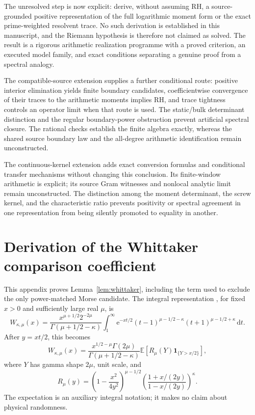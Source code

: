 \documentclass[11pt,letterpaper]{article}
\numberwithin{equation}{section}
\theoremstyle{definition}
\theoremstyle{remark}
\newcommand{\dd}{\,\mathrm d}
\newcommand{\e}{\mathrm e}
\begin{document}
The unresolved step is now explicit: derive, without assuming RH, a source-grounded positive representation of the full logarithmic moment form or the exact prime-weighted resolvent trace. No such derivation is established in this manuscript, and the Riemann hypothesis is therefore not claimed as solved. The result is a rigorous arithmetic realization programme with a proved criterion, an executed model family, and exact conditions separating a genuine proof from a spectral analogy.

The compatible-source extension supplies a further conditional route: positive interior elimination yields finite boundary candidates, coefficientwise convergence of their traces to the arithmetic moments implies RH, and trace tightness controls an operator limit when that route is used. The static/bulk determinant distinction and the regular boundary-power obstruction prevent artificial spectral closure. The rational checks establish the finite algebra exactly, whereas the shared source boundary law and the all-degree arithmetic identification remain unconstructed.

The continuous-kernel extension adds exact conversion formulas and conditional transfer mechanisms without changing this conclusion. Its finite-window arithmetic is explicit; its source Gram witnesses and nonlocal analytic limit remain unconstructed. The distinction among the moment determinant, the screw kernel, and the characteristic ratio prevents positivity or spectral agreement in one representation from being silently promoted to equality in another.

\appendix
\section{Derivation of the Whittaker comparison coefficient}
\label{app:whittaker}
This appendix proves Lemma~\ref{lem:whittaker}, including the term used to exclude the only power-matched Morse candidate. The integral representation \cite{dlmf}, for fixed $x>0$ and sufficiently large real $\mu$, is
\begin{equation}
 W_{\kappa,\mu}(x)=
 \frac{x^{\mu+1/2}2^{-2\mu}}{\Gamma(\mu+1/2-\kappa)}
 \int_1^\infty\e^{-xt/2}
 (t-1)^{\mu-1/2-\kappa}(t+1)^{\mu-1/2+\kappa}\dd t.
 \label{eq:whittakerintegral}
\end{equation}
After $y=xt/2$, this becomes
\begin{equation}
 W_{\kappa,\mu}(x)=
 \frac{x^{1/2-\mu}\Gamma(2\mu)}{\Gamma(\mu+1/2-\kappa)}
 \mathbb E\!\left[R_\mu(Y)\mathbf1_{\{Y>x/2\}}\right],
 \label{eq:gammaexpectation}
\end{equation}
where $Y$ has gamma shape $2\mu$, unit scale, and
\begin{equation}
 R_\mu(y)=
 \left(1-\frac{x^2}{4y^2}\right)^{\mu-1/2}
 \left(\frac{1+x/(2y)}{1-x/(2y)}\right)^\kappa.
 \label{eq:Rmu}
\end{equation}
The expectation is an auxiliary integral notation; it makes no claim about physical randomness.
\end{document}
